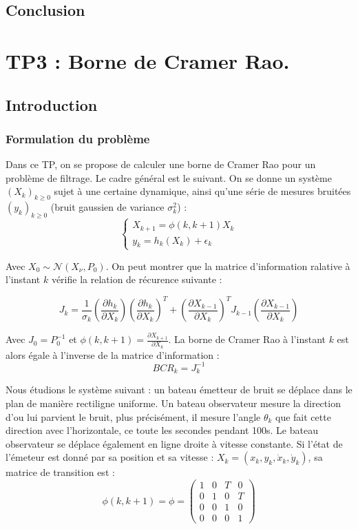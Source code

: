 \documentclass{article}
\begin{document}
\subsection{Conclusion}


\newpage

\section{TP3 : Borne de Cramer Rao.}
\subsection{Introduction}
\subsubsection{Formulation du problème}

Dans ce TP, on se propose de calculer une borne de Cramer Rao pour un problème de filtrage. Le cadre général est le suivant.
On se donne un système  $(X_{k})_{k\geq 0}$ sujet à une certaine dynamique,
ainsi qu'une série de mesures bruitées $(y_{k})_{k \geq 0}$ (bruit gaussien de variance $\sigma_{k}^{2}$) : 
\[\left\{\begin{array}{ll}
   X_{k+1} = \phi(k,k+1)X_{k} \\
   y_{k}=h_{k}(X_{k})+\epsilon_{k}
\end{array}\right. \]

Avec $X_{0} \sim  \mathcal{N} (X_{\nu},P_{0})$. On peut montrer que la matrice d'information ralative à l'instant $k$ vérifie
la relation de récurence suivante : 

\[ J_{k} = \frac{1}{\sigma_{k}}\left(\frac{\partial h_{k}}{\partial X_{k}}\right)\left(\frac{\partial h_{k}}{\partial X_{k}}\right)^{T}+\left(\frac{\partial X_{k-1}}{\partial X_{k}}\right)^{T}J_{k-1}\left(\frac{\partial X_{k-1}}{\partial X_{k}}\right)\]

Avec $J_{0}=P_{0}^{-1}$ et $\phi(k,k+1)=\frac{\partial X_{k+1}}{\partial X_{k}}$.
La borne de Cramer Rao à l'instant $k$ est alors égale à l'inverse de la matrice d'information : 
\[BCR_{k}= J_{k}^{-1}\]

Nous étudions le système suivant : un bateau émetteur de bruit se déplace dans le plan de manière rectiligne uniforme. 
Un bateau observateur mesure la direction d'ou lui parvient le bruit, plus précisément, il mesure l'angle $\theta_{k}$ que fait cette direction avec l'horizontale, ce toute les secondes pendant 100s. Le bateau observateur se déplace également en ligne droite à vitesse constante.
Si l'état de l'émeteur est donné par sa position et sa vitesse : $X_{k} = (x_{k},y_{k},\dot{x}_{k},\dot{y}_{k})$, sa matrice de transition est :
\[\phi(k,k+1) = \phi =  \begin{pmatrix}
  1 & 0 & T & 0 \\
  0 & 1 & 0 & T \\
  0 & 0 & 1 & 0 \\
  0 & 0 & 0 & 1 
  \end{pmatrix}\]
\end{document}
